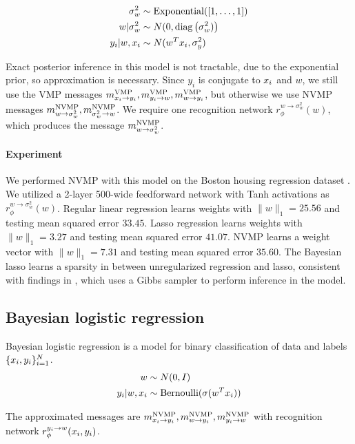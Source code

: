 \begin{align*}
    \sigma_w^2 &\sim \text{Exponential}([1, \ldots, 1]) \\
    w | \sigma^2_w &\sim N(0, \text{diag}\left(\sigma_w^2)\right) \\
    y_i | w, x_i &\sim N(w^Tx_i, \sigma^2_y)
\end{align*}

Exact posterior inference in this model is not tractable, due
to the exponential prior, so approximation is necessary. 
Since $y_i$ is conjugate to $x_i$ and $w$, we still use
the VMP messages $m^{\text{VMP}}_{x_i \rightarrow y_i}, m^{\text{VMP}}_{y_i \rightarrow w}, m^{\text{VMP}}_{w \rightarrow y_i}$,
but otherwise we use NVMP messages $m^{\text{NVMP}}_{w \rightarrow \sigma_w^2}, m^{\text{NVMP}}_{\sigma_w^2 \rightarrow w}$. We require one recognition
network $r_{\phi}^{w \rightarrow \sigma^2_w}(w)$, which produces the message $m^{\text{NVMP}}_{w \rightarrow \sigma_w^2}$.

\paragraph{Experiment} We performed NVMP with this model on the
Boston housing regression dataset \cite{uci}.
We utilized a 2-layer 500-wide feedforward network with Tanh activations
as $r_{\phi}^{w \rightarrow \sigma^2_w}(w)$.
Regular linear regression learns weights with $\|w\|_1 = 25.56$
and testing mean squared error $33.45$.
Lasso regression learns weights with $\|w\|_1 = 3.27$ 
and testing mean squared error $41.07$.
NVMP learns a weight vector with $\|w\|_1 = 7.31$
and testing mean squared error $35.60$.
The Bayesian lasso learns a sparsity
in between unregularized regression and lasso,
consistent with findings in \cite{bayesianlasso},
which uses a Gibbs sampler to perform inference in the model.

\subsection{Bayesian logistic regression}

Bayesian logistic regression is a model for binary classification
of data and labels $\{x_i, y_i\}_{i = 1}^N$.
\begin{align*}
    w &\sim N(0, I) \\
    y_i | w, x_i &\sim \text{Bernoulli}(\sigma(w^Tx_i))
\end{align*}

The approximated messages are $m^{\text{NVMP}}_{x_i \rightarrow y_i}, m^{\text{NVMP}}_{w \rightarrow y_i}, m^{\text{NVMP}}_{y_i \rightarrow w}$ with recognition network $r_{\phi}^{y_i \rightarrow w}(x_i, y_i)$.

